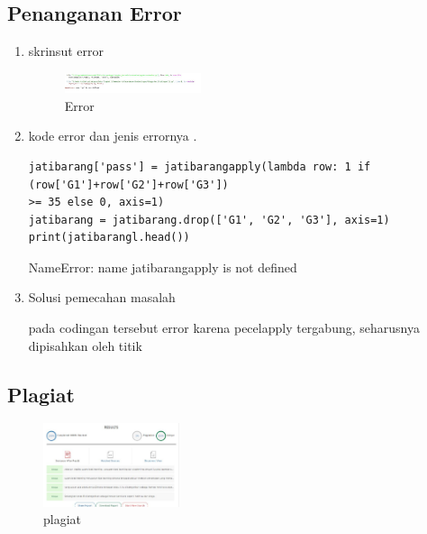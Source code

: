 \subsection{Penanganan Error}
\begin{enumerate}
\item skrinsut error
\begin{figure}[H]
\centering
\includegraphics[width= 4cm]{figures/1174039/chapter2/eror.JPG}
\caption{Error}

\end{figure}

\item kode error dan jenis errornya .
\begin{verbatim}
jatibarang['pass'] = jatibarangapply(lambda row: 1 if (row['G1']+row['G2']+row['G3'])
>= 35 else 0, axis=1)
jatibarang = jatibarang.drop(['G1', 'G2', 'G3'], axis=1)
print(jatibarangl.head())
\end{verbatim}

NameError: name jatibarangapply is not defined

\item Solusi pemecahan masalah \par
pada codingan tersebut error karena pecelapply tergabung, seharusnya dipisahkan oleh titik
\end{enumerate}


\subsection{Plagiat}
\begin{figure}[H]
\centering
\includegraphics[width= 4cm]{figures/1174039/chapter2/plagiat.JPG}
\caption{plagiat}

\end{figure}